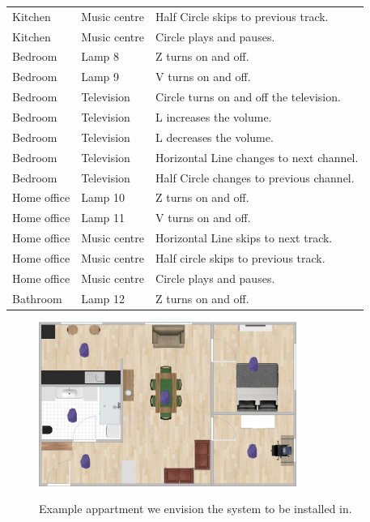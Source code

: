 \begin{table}[]
\begin{tabular}{lll}
Kitchen                    & Music centre                        & Half Circle skips to previous track.     \\
Kitchen                    & Music centre                        & Circle plays and pauses.                 \\
Bedroom                    & Lamp 8                              & Z turns on and off.                      \\
Bedroom                    & Lamp 9                              & V turns on and off.                      \\
Bedroom                    & Television                          & Circle turns on and off the television.  \\
Bedroom                    & Television                          & L increases the volume.                  \\
Bedroom                    & Television                          & L decreases the volume.                  \\
Bedroom                    & Television                          & Horizontal Line changes to next channel. \\
Bedroom                    & Television                          & Half Circle changes to previous channel. \\
Home office                & Lamp 10                             & Z turns on and off.                      \\
Home office                & Lamp 11                             & V turns on and off.                      \\
Home office                & Music centre                        & Horizontal Line skips to next track.     \\
Home office                & Music centre                        & Half circle skips to previous track.     \\
Home office                & Music centre                        & Circle plays and pauses.                 \\
Bathroom                   & Lamp 12                             & Z turns on and off.                     
\end{tabular}
\end{table}

\begin{figure}[h!]
\centering
\includegraphics[width=0.75\textwidth]{images/room-with-beacons}
\label{fig:analysis:scenario:appartment}
\caption{Example appartment we envision the system to be installed in.}
\end{figure}

